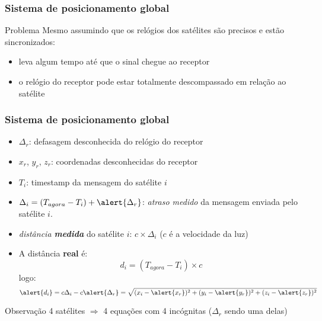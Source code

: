 \documentclass[Ligatures=TeX,table,brazil,svgnames,usetotalslideindicator,compress,10pt]{beamer}
\begin{document}
\begin{frame}
  \frametitle{Sistema de posicionamento global}
  \begin{block}{Problema}
    Mesmo assumindo que os relógios dos satélites são precisos e estão sincronizados:
    \begin{itemize}
    \item leva algum tempo até que o sinal chegue ao receptor
    \item o relógio do receptor pode estar totalmente descompassado em relação ao satélite
    \end{itemize}
  \end{block}
\end{frame}

\begin{frame}
  \frametitle{Sistema de posicionamento global}

  \begin{itemize}
  \item \alert{$\Delta_r$}: \alert{defasagem desconhecida} do relógio do receptor
  \item \alert{$x_r$}, \alert{$y_r$}, \alert{$z_r$}: \alert{coordenadas desconhecidas} do receptor
  \item $T_i$: timestamp da mensagem do satélite $i$
  \item $\Delta_i = (T_{agora} - T_i) + \alert{\Delta_r}$: \emph{atraso medido} da mensagem enviada pelo satélite $i$.
  \item \emph{distância \textbf{medida}} do satélite $i$: $c \times \Delta_i$
    \newline ($c$ é a velocidade da luz)
  \item A distância \textbf{real} é:\\
    \[d_i=(T_{agora}- T_i) \times c\]
    logo:
    \[ \alert{d_i} = c \Delta_i - c \alert{\Delta_r} = \sqrt{(x_i - \alert{x_r})^2 + (y_i - \alert{y_r})^2 + (z_i - \alert{z_r})^2}\]

  \end{itemize}

  \begin{block}{Observação}
    4 satélites $\Rightarrow$ 4 equações com 4 incógnitas (\alert{$\Delta_r$} sendo uma delas)
  \end{block}

\end{frame}
\end{document}
